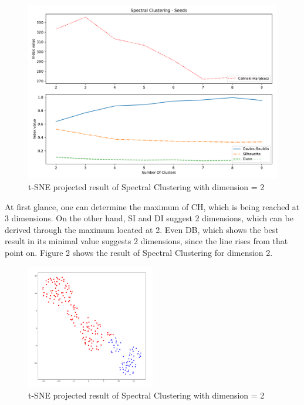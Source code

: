 \begin{figure}[H]
    \centering
    \includegraphics[width=1\textwidth]{images/Spectral_Clustering_-_Seeds.pdf}
    \caption{t-SNE projected result of Spectral Clustering with dimension = 2}
    \label{fig:my_label}
\end{figure}


At first glance, one can determine the maximum of CH, which is being reached at 3 dimensions. On the other hand, SI and DI suggest 2 dimensions, which can be derived through the maximum located at 2. Even DB, which shows the best result in its minimal value suggests 2 dimensions, since the line rises from that point on. Figure 2 shows the result of Spectral Clustering for dimension 2.

\begin{figure}[H]
    \centering
    \includegraphics[width=0.5\textwidth]{images/k2.PNG}
    \caption{t-SNE projected result of Spectral Clustering with dimension = 2}
    \label{fig:my_label}
\end{figure}


